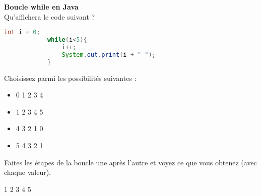     
    \begin{Exercice}[5 minutes] \textbf{Boucle while en Java}\\
      	Qu'affichera le code suivant ?
      	
      	\begin{lstlisting}[language=Java]
            int i = 0;
            while(i<5){
            	i++;
            	System.out.print(i + " ");
            }
     	\end{lstlisting}
             	
        Choisissez parmi les possibilités suivantes :
        
        \begin{itemize}
        
        \item 0 
        1 
        2 
        3 
        4 
        \item 1  
        2 
        3 
        4 
        5 
        \item 4 
        3 
        2 
        1 
        0 
        \item 5 
        4 
        3 
        2 
        1
        \end{itemize}
    
        \begin{conseil}
		   Faites les étapes de la boucle une après l'autre et voyez ce que vous obtenez (avec chaque valeur).  
        \end{conseil}
        
        \begin{solution}
            1 
            2 
            3 
            4 
            5
        \end{solution}
    \end{Exercice} 
	

